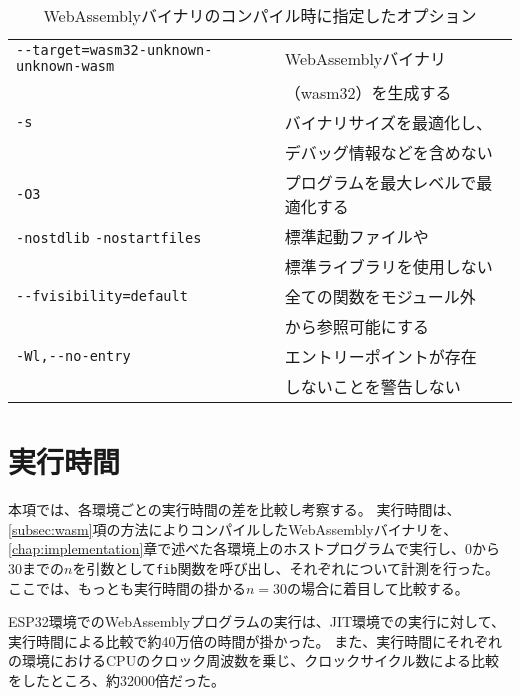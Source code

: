 \begin{table}[htbp]
  \label{tab:compiler}
  \caption{WebAssemblyバイナリのコンパイル時に指定したオプション}
  \begin{center}
    \begin{tabular}{ll}
    \hline
    \verb|--target=wasm32-unknown-unknown-wasm| & WebAssemblyバイナリ \\
    & （wasm32）を生成する \\ \hline
    \verb|-s| & バイナリサイズを最適化し、 \\
    & デバッグ情報などを含めない \\ \hline
    \verb|-O3| & プログラムを最大レベルで最適化する \\ \hline
    \verb|-nostdlib| \verb|-nostartfiles| & 標準起動ファイルや\\
    & 標準ライブラリを使用しない \\ \hline
    \verb|--fvisibility=default| & 全ての関数をモジュール外 \\
    & から参照可能にする \\ \hline
    \verb|-Wl,--no-entry| & エントリーポイントが存在 \\
    & しないことを警告しない \\ \hline
    \end{tabular}
  \end{center}
\end{table}

\section{実行時間}

本項では、各環境ごとの実行時間の差を比較し考察する。
実行時間は、\ref{subsec:wasm}項の方法によりコンパイルしたWebAssemblyバイナリを、\ref{chap:implementation}章で述べた各環境上のホストプログラムで実行し、0から30までの$n$を引数として\verb|fib|関数を呼び出し、それぞれについて計測を行った。
ここでは、もっとも実行時間の掛かる$n=30$の場合に着目して比較する。

ESP32環境でのWebAssemblyプログラムの実行は、JIT環境での実行に対して、実行時間による比較で約40万倍の時間が掛かった。
また、実行時間にそれぞれの環境におけるCPUのクロック周波数を乗じ、クロックサイクル数による比較をしたところ、約32000倍だった。

